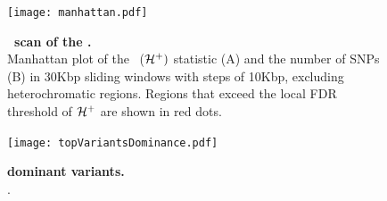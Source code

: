 \begin{figure}[H]
	\centering
	\texttt{[image: manhattan.pdf]}
	\caption{{\bf \comale\ scan of the \datadm.}\\ Manhattan plot
          of the \comale\ (${\cal H}^{+})$ statistic (A) and the number of
          SNPs (B) in 30Kbp sliding windows with steps of 10Kbp,
          excluding heterochromatic regions. Regions that exceed the local 
          FDR threshold of ${\cal H}^+$ are shown in
          red dots.}
	\label{fig:manhattancutoffed}
\end{figure}

\begin{figure}[H]
	\centering
	\texttt{[image: topVariantsDominance.pdf]}
	\caption{{\bf dominant variants.}\\ .}
	\label{fig:dominantVariants}
\end{figure}

\clearpage
\newpage